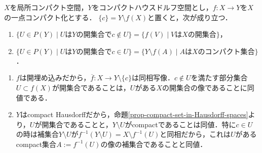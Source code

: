 \documentclass[uplatex,dvipdfmx]{jsreport}
\begin{document}
\begin{lemma}
    $X$を局所コンパクト空間，$Y$をコンパクトハウスドルフ空間とし，$f:X\to Y$を$X$の一点コンパクト化とする．
    $\{c\}=Y\setminus f(X)$と置くと，次が成り立つ．
    \begin{enumerate}
        \item $\{U\in P(Y)\mid UはYの開集合でc\notin U\}=\{f(V)\mid VはXの開集合\}$，
        \item $\{U\in P(Y)\mid UはYの開集合でc\in U\}=\{Y\setminus f(A)\mid AはXのコンパクト集合\}$．
    \end{enumerate}
\end{lemma}
\begin{Proof}\mbox{}
    \begin{enumerate}
        \item $f$は開埋め込みだから，$\overline{f}:X\to Y\setminus\{c\}$は同相写像．$c\notin U$を満たす部分集合$U\subset f(X)$が開集合であることは，$U$がある$X$の開集合の像であることに同値である．
        \item $Y$はcompact Hausdorffだから，命題\ref{prop-compact-set-in-Hausdorff-spaces}より，$U$が開集合であることと，$Y\setminus U$がcompactであることは同値．特に$c\in U$の時は補集合$Y\setminus U$が$f^{-1}(Y\setminus U)=X\setminus f^{-1}(U)$と同相だから，これは$U$があるcompact集合$A:=f^{-1}(U)$の像の補集合であることと同値．
    \end{enumerate}
\end{Proof}
\end{document}
